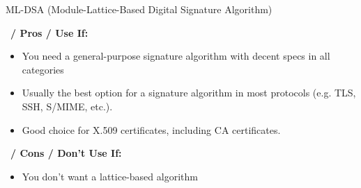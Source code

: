 \begin{algorithmbox}{ML-DSA (Module-Lattice-Based Digital Signature Algorithm)}
    \begin{minipage}[t]{0.49\textwidth}
        \scriptsize\faThumbsUp\, {\bfseries / Pros / Use If:}
        \begin{itemize}[leftmargin=*]
            \setlength\itemsep{0em}
            \item You need a general-purpose signature algorithm with decent specs in all categories
            \item Usually the best option for a signature algorithm in most protocols (e.g. TLS, SSH, S/MIME, etc.).
            \item Good choice for X.509 certificates, including CA certificates.
        \end{itemize}
    \end{minipage}
    \hfill
    \begin{minipage}[t]{0.49\textwidth}
        \scriptsize \faThumbsDown\, {\bfseries / Cons / Don't Use If:}
        \begin{itemize}[leftmargin=*]
            \setlength\itemsep{0em}
            \item You don't want a lattice-based algorithm
        \end{itemize}
    \end{minipage}
\end{algorithmbox}
